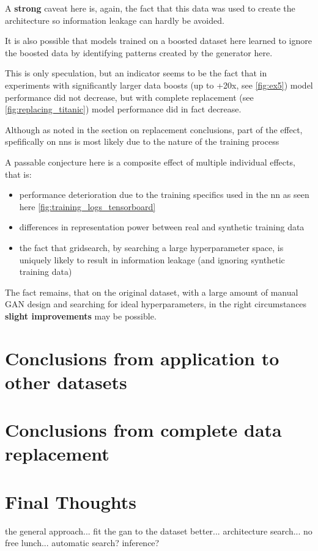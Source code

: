 A \textbf{strong} caveat here is, again, the fact that this data was used to create the architecture so information leakage can hardly be avoided.

It is also possible that models trained on a boosted dataset here learned to ignore the boosted data by identifying patterns created by the generator here. 

This is only speculation, but an indicator seems to be the fact that in experiments with significantly larger data boosts (up to +20x, see \ref{fig:ex5}) model performance did not decrease, but with complete replacement (see \ref{fig:replacing_titanic}) model performance did in fact decrease. 

Although as noted in the section on replacement conclusions, part of the effect, spefifically on \acp{nn} is most likely due to the nature of the training process

\pagebreak

A passable conjecture here is a composite effect of multiple individual effects, that is: 

\begin{itemize}
	\item performance deterioration due to the training specifics used in the \ac{nn} as seen here \ref{fig:training_logs_tensorboard}
	\item differences in representation power between real and synthetic training data
	\item the fact that gridsearch, by searching a large hyperparameter space, is uniquely likely to result in information leakage (and ignoring synthetic training data)
\end{itemize}

The fact remains, that on the original dataset, with a large amount of manual \ac{GAN} design and searching for ideal hyperparameters, in the right circumstances \textbf{slight improvements} may be possible.

\pagebreak

\section{Conclusions from application to other datasets}

\pagebreak

\section{Conclusions from complete data replacement}

\cite{ares_utility}

\pagebreak

\section{Final Thoughts}

the general approach... fit the gan to the dataset better... architecture search... no free lunch... automatic search? inference?

\pagebreak
